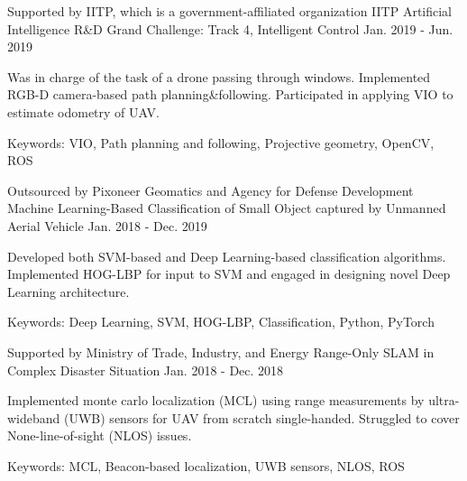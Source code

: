 \begin{cventries}
    \cventry
      {Supported by IITP, which is a government-affiliated organization} %
      {IITP Artificial Intelligence R\&D Grand Challenge: Track 4, Intelligent Control} %
      {\urban} %
      {Jan. 2019 - Jun. 2019} %
      {
        \begin{cvitems} %
          \item Was in charge of the task of a drone passing through windows. Implemented RGB-D camera-based path planning\&following. Participated in applying VIO to estimate odometry of UAV.
          \item Keywords: VIO, Path planning and following, Projective geometry, OpenCV, ROS
        \end{cvitems}
      }

    \cventry
      {Outsourced by Pixoneer Geomatics and Agency for Defense Development} %
      {Machine Learning-Based Classification of Small Object captured by Unmanned Aerial Vehicle} %
      {\urban} %
      {Jan. 2018 - Dec. 2019} %
      {
        \begin{cvitems} %
          \item Developed both SVM-based and Deep Learning-based classification algorithms. Implemented HOG-LBP for input to SVM and engaged in designing novel Deep Learning architecture.
          \item Keywords: Deep Learning, SVM, HOG-LBP, Classification, Python, PyTorch
        \end{cvitems}
      }

    \cventry
      {Supported by Ministry of Trade, Industry, and Energy} %
      {Range-Only SLAM in Complex Disaster Situation} %
      {\urban} %
      {Jan. 2018 - Dec. 2018} %
      {
        \begin{cvitems} %
          \item Implemented monte carlo localization (MCL) using range measurements by ultra-wideband (UWB) sensors for UAV from scratch single-handed. Struggled to cover None-line-of-sight (NLOS) issues.
          \item Keywords: MCL, Beacon-based localization, UWB sensors, NLOS, ROS
        \end{cvitems}
      }

\end{cventries}
